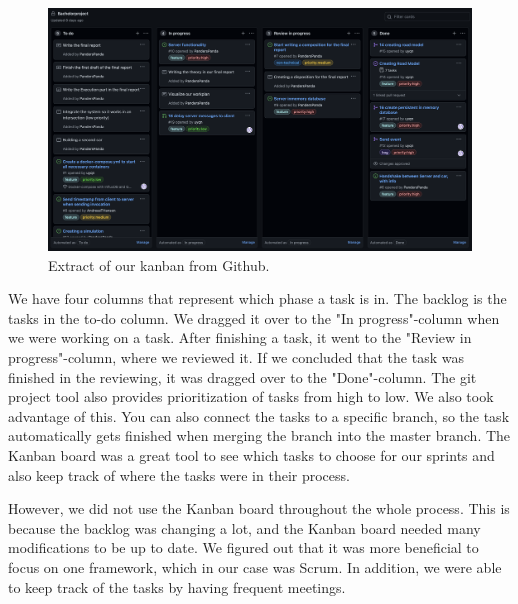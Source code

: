 \begin{figure}[h!]
	\centering
	\includegraphics[width=1\linewidth]{figures/kanban_screenshot}
	\caption[kanban screenshot]{Extract of our kanban from Github.}
	\label{fig:kanbanscreenshot}
\end{figure}

We have four columns that represent which phase a task is in. The backlog is the tasks in the to-do column. We dragged it over to the "In progress"-column when we were working on a task. After finishing a task, it went to the "Review in progress"-column, where we reviewed it. If we concluded that the task was finished in the reviewing, it was dragged over to the "Done"-column. The git project tool also provides prioritization of tasks from high to low. We also took advantage of this. You can also connect the tasks to a specific branch, so the task automatically gets finished when merging the branch into the master branch. The Kanban board was a great tool to see which tasks to choose for our sprints and also keep track of where the tasks were in their process.

However, we did not use the Kanban board throughout the whole process. This is because the backlog was changing a lot, and the Kanban board needed many modifications to be up to date. We figured out that it was more beneficial to focus on one framework, which in our case was Scrum. In addition, we were able to keep track of the tasks by having frequent meetings. 